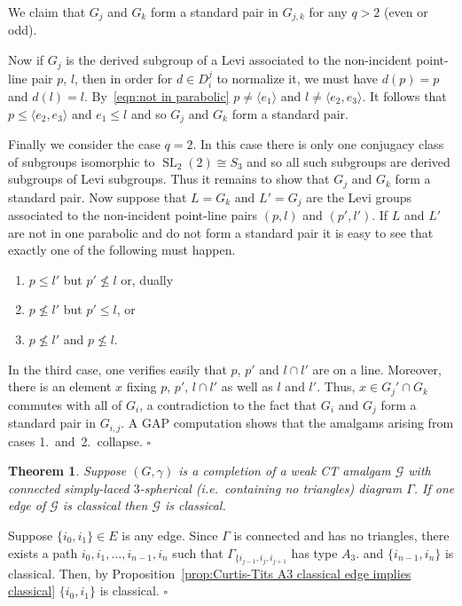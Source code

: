 \documentclass[12pt]{amsart}
\newtheorem{theorem}{Theorem}[section]
\theoremstyle{definition}
\newcommand{\bpf}{\noindent{\bf Proof}\hspace{7pt}}
\newcommand{\epf}{\qed}
\newcommand{\bth}{\begin{theorem}}
\renewcommand{\eth}{\end{theorem}}
\DeclareMathOperator{\SL}{SL}
\renewcommand{\qed}{\hfill $\square$}
\newcommand{\compG}{{{G}}}
\newcommand{\amG}{{\mathscr{G}}}
\newcommand{\liediag}{\Gamma}
\begin{document}
We claim that $\compG_j$ and $\compG_k$ form a standard pair in $\compG_{j,k}$ for any $q>2$ (even or odd).

Now if $\compG_j$ is the derived subgroup of  a Levi associated to the non-incident point-line pair 
 $p$, $l$, then in order for $d\in D_i^j$ to normalize it, we must have $d(p)=p$ and $d(l)=l$.
By~\eqref{eqn:not in parabolic} $p\ne \langle e_1\rangle$ and $l\ne \langle e_2,e_3\rangle$.
It follows that $p\le \langle e_2,e_3\rangle$ and $e_1\le l$ and so $\compG_j$ and $\compG_k$ form a standard pair.
  
Finally we consider the case $q=2$.
In this case there is only one conjugacy class of subgroups isomorphic to $\SL_2(2)\cong S_3$ and so all such subgroups are derived subgroups of Levi subgroups.
Thus it remains to show that $\compG_j$ and $\compG_k$ form a standard pair.
Now suppose that $L=\compG_k$ and $L'=\compG_j$ are the Levi groups associated to the non-incident point-line pairs $(p,l)$ and $(p',l')$.
If $L$ and $L'$ are not in one parabolic and do not form a standard pair it is easy to see that exactly one of the following must happen.
\begin{enumerate}
\item $p\le  l'$ but $p'\not\le l$ or, dually 
\item $p\not\le l'$ but $p'\le l$, or 
\item $p\not\le l'$ and $p\not\le l$.
\end{enumerate}
In the third case, one verifies easily that $p$, $p'$ and $l\cap l'$ are on a line.
Moreover, there is an element $x$ fixing $p$, $p'$, $l\cap l'$ as well as $l$ and $l'$.
Thus, $x\in \compG_j'\cap \compG_k$ commutes with all of $\compG_i$, a contradiction to the fact that $\compG_i$ and $\compG_j$ form a standard pair in $\compG_{i,j}$.
A GAP computation shows that the amalgams arising from cases 1.~and~2.~collapse. 
\qed

\bth
\label{thm:simply-laced classical edge implies classical}
Suppose $(\compG,\gamma)$ is a completion of a weak CT amalgam $\amG$ with 
connected simply-laced $3$-spherical (i.e.~containing no triangles) diagram $\liediag$.
If one edge of $\amG$ is classical then $\amG$ is classical.
\eth
\bpf
Suppose $\{i_0,i_1\}\in E$ is any edge. Since $\liediag$ is connected and has no triangles, there exists a path
 $i_0,i_1,\ldots,i_{n-1},i_n$ such that $\liediag_{\{i_{j-1},i_j,i_{j+1}}$ has type $A_3$.
 and $\{i_{n-1},i_n\}$ is classical.
Then, by Proposition~\ref{prop:Curtis-Tits A3 classical edge implies classical} $\{i_0,i_1\}$ is classical. 
\epf
\end{document}
